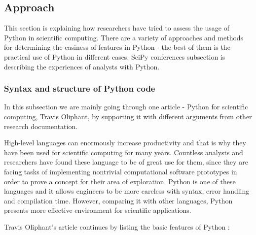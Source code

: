 \subsection*{Approach}
\label{approach}
This section is explaining how researchers have tried to assess the usage of Python in scientific computing. There are a variety of approaches and methods for determining the easiness of features in Python - the best of them is the practical use of Python in different cases. SciPy conferences subsection is describing the experiences of analysts with Python. 

\subsubsection*{Syntax and structure of Python code} 
\label{syntax}

In this subsection we are mainly going through one article - Python for scientific computing, Travis Oliphant, by supporting it with different arguments from other research documentation. \cite{oliphant2007python}

High-level languages can enormously increase productivity and that is why they have been used for scientific computing for many years. Countless analysts and researchers have found these language to be of great use for them, since they are facing tasks of implementing nontrivial computational software prototypes in order to prove a concept for their area of exploration. Python is one of these languages and it allows engineers to be more careless with syntax, error handling and compilation time. However, comparing it with other languages, Python presents more effective environment for scientific applications.

Travis Oliphant's article continues by listing the basic features of Python  \cite{oliphant2007python}:

